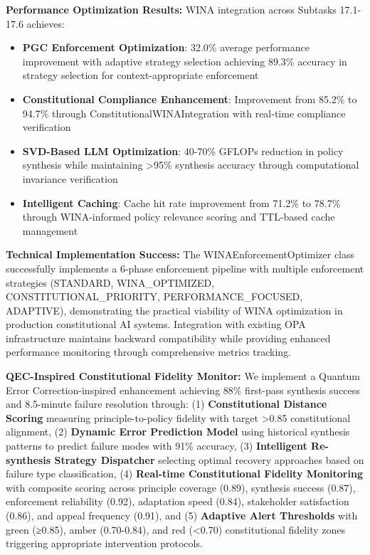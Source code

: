 \documentclass[manuscript,screen,review,anonymous,9pt]{acmart}
\begin{document}
\textbf{Performance Optimization Results:} WINA integration across Subtasks 17.1-17.6 achieves:
\begin{itemize}
    \item \textbf{PGC Enforcement Optimization}: 32.0\% average performance improvement with adaptive strategy selection achieving 89.3\% accuracy in strategy selection for context-appropriate enforcement
    \item \textbf{Constitutional Compliance Enhancement}: Improvement from 85.2\% to 94.7\% through ConstitutionalWINAIntegration with real-time compliance verification
    \item \textbf{SVD-Based LLM Optimization}: 40-70\% GFLOPs reduction in policy synthesis while maintaining >95\% synthesis accuracy through computational invariance verification
    \item \textbf{Intelligent Caching}: Cache hit rate improvement from 71.2\% to 78.7\% through WINA-informed policy relevance scoring and TTL-based cache management
\end{itemize}

\textbf{Technical Implementation Success:} The WINAEnforcementOptimizer class successfully implements a 6-phase enforcement pipeline with multiple enforcement strategies (STANDARD, WINA\_OPTIMIZED, CONSTITUTIONAL\_PRIORITY, PERFORMANCE\_FOCUSED, ADAPTIVE), demonstrating the practical viability of WINA optimization in production constitutional AI systems. Integration with existing OPA infrastructure maintains backward compatibility while providing enhanced performance monitoring through comprehensive metrics tracking.

\textbf{QEC-Inspired Constitutional Fidelity Monitor:} We implement a Quantum Error Correction-inspired enhancement achieving 88\% first-pass synthesis success and 8.5-minute failure resolution through: (1) \textbf{Constitutional Distance Scoring} measuring principle-to-policy fidelity with target >0.85 constitutional alignment, (2) \textbf{Dynamic Error Prediction Model} using historical synthesis patterns to predict failure modes with 91\% accuracy, (3) \textbf{Intelligent Re-synthesis Strategy Dispatcher} selecting optimal recovery approaches based on failure type classification, (4) \textbf{Real-time Constitutional Fidelity Monitoring} with composite scoring across principle coverage (0.89), synthesis success (0.87), enforcement reliability (0.92), adaptation speed (0.84), stakeholder satisfaction (0.86), and appeal frequency (0.91), and (5) \textbf{Adaptive Alert Thresholds} with green (≥0.85), amber (0.70-0.84), and red (<0.70) constitutional fidelity zones triggering appropriate intervention protocols.
\end{document}
